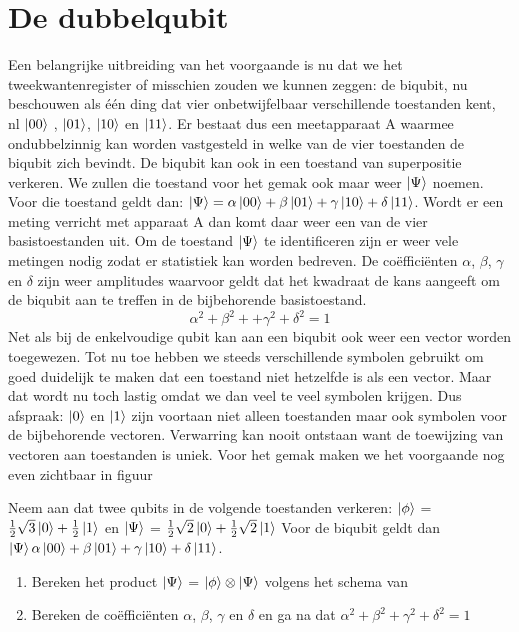 \documentclass[../main.tex]{subfiles}
\begin{document}
\section{De dubbelqubit}
Een belangrijke uitbreiding van het voorgaande is nu dat we het tweekwantenregister of misschien zouden we kunnen zeggen: de biqubit, nu beschouwen als \'e\'en ding dat vier onbetwijfelbaar verschillende toestanden kent, nl $\ket{00}$ , $\ket{01}$, $\ket{10}$ en $\ket{11}$. Er bestaat dus een meetapparaat A waarmee ondubbelzinnig kan worden vastgesteld in welke van de vier toestanden de biqubit zich bevindt.
De biqubit kan ook in een toestand van superpositie verkeren. We zullen die toestand voor het gemak ook maar weer $\ket{\Psi}$ noemen.
Voor die toestand geldt dan: $\ket{\Psi} =\alpha\ket{00} + \beta\ket{01} + \gamma\ket{10} +\delta\ket{11}$.
Wordt er een meting verricht met apparaat A dan komt daar weer een van de vier basistoestanden uit. Om de toestand $\ket{\Psi}$ te identificeren zijn er weer vele metingen nodig zodat er statistiek kan worden bedreven. De co\"effici\"enten $\alpha$, $\beta$, $\gamma$ en $\delta$ zijn weer amplitudes waarvoor geldt  dat het kwadraat de kans aangeeft om de biqubit aan te treffen in de bijbehorende basistoestand.		
\[\alpha^2 + \beta^2+ +\gamma^2+\delta^2 = 1\]
Net als bij de enkelvoudige qubit kan aan een biqubit ook weer een vector worden toegewezen. Tot nu toe hebben we steeds verschillende symbolen gebruikt om goed duidelijk te maken dat een toestand niet hetzelfde is als een vector. Maar dat wordt nu toch lastig omdat we dan veel te veel symbolen krijgen. Dus afspraak:
$\ket{0}$ en $\ket{1}$ zijn voortaan niet alleen toestanden maar ook symbolen voor de bijbehorende vectoren. Verwarring kan nooit ontstaan want de toewijzing van vectoren aan toestanden is uniek. 
Voor het gemak maken we het voorgaande nog even zichtbaar in figuur 

\begin{antwoord}
\end{antwoord}
\begin{opdracht}
Neem aan dat twee qubits in de volgende toestanden verkeren:
$\ket{\phi}$ = $\frac{1}{2}\sqrt{3}\ket{0} + \frac{1}{2}\ket{1}$ en $\ket{\Psi}$ = $\frac{1}{2}\sqrt{2}\ket{0} + \frac{1}{2}\sqrt{2} \ket{1}$
Voor de biqubit geldt dan $\ket{\Psi} \alpha \ket{00} + \beta\ket{01} + \gamma\ket{10} + \delta\ket{11}$.
\begin{enumerate}
\item Bereken het product $\ket{\Psi}$ = $\ket{\phi} \otimes \ket{\Psi}$ volgens het schema van 
\item Bereken de co\"effici\"enten $\alpha$, $\beta$, $\gamma$ en $\delta$ en ga na dat $\alpha^2 + \beta^2 + \gamma^2 + \delta^2 = 1$
\end{enumerate}
\end{opdracht}
\end{document}
